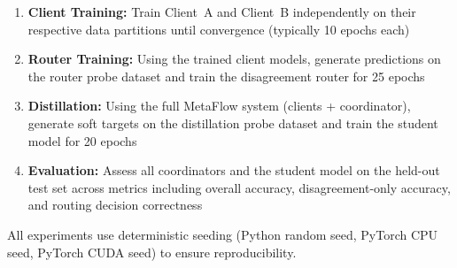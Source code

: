 \begin{enumerate}
    \item \textbf{Client Training:} Train Client~A and Client~B independently on their respective data partitions until convergence (typically 10 epochs each)
    
    \item \textbf{Router Training:} Using the trained client models, generate predictions on the router probe dataset and train the disagreement router for 25 epochs
    
    \item \textbf{Distillation:} Using the full MetaFlow system (clients + coordinator), generate soft targets on the distillation probe dataset and train the student model for 20 epochs
    
    \item \textbf{Evaluation:} Assess all coordinators and the student model on the held-out test set across metrics including overall accuracy, disagreement-only accuracy, and routing decision correctness
\end{enumerate}

All experiments use deterministic seeding (Python random seed, PyTorch CPU seed, PyTorch CUDA seed) to ensure reproducibility.
